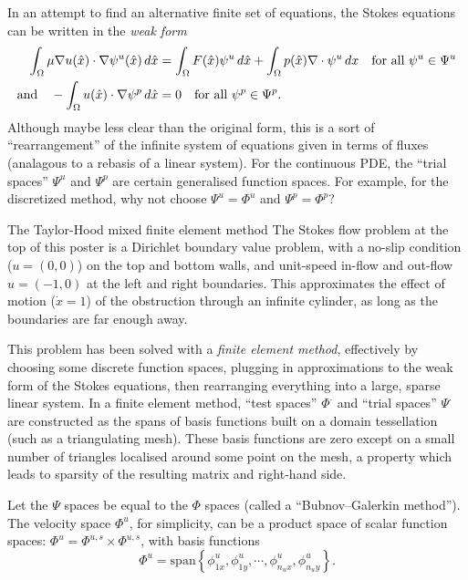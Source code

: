 \documentclass{article}
\begin{document}
In an attempt to find an alternative finite set of equations, the Stokes equations can be written in the \textit{weak form}
\begin{equation}\label{steady_stokes_weak_form}
\begin{split}
        \int_{\Omega} \mu\nabla u(\hat{x})\cdot \nabla\psi^u(\hat{x})\,d\hat{x}
            &= \int_{\Omega}F(\hat{x})\psi^u\,d\hat{x}
            +\int_{\Omega} p(\hat{x})\nabla\cdot\psi^u\,dx \text{\quad for all $\psi^u \in \Psi^u$}\\
    \text{and\quad} -\int_{\Omega}u(\hat{x})\cdot\nabla\psi^p\,d\hat{x} &= 0 \text{\quad for all $\psi^p \in \Psi^p$}.
\end{split}
\end{equation}
Although maybe less clear than the original form, this is a sort of ``rearrangement'' of the infinite system of equations given in terms of fluxes
(analagous to a rebasis of a linear system).
For the continuous PDE, the ``trial spaces'' $\Psi^u$ and $\Psi^p$ are certain generalised function spaces.
For example, for the discretized method, why not choose $\Psi^u = \Phi^u$ and $\Psi^p = \Phi^p$?


\newpage
\vskip 0.2in
{\large The Taylor-Hood mixed finite element method}
\vskip 0.2in
The Stokes flow problem at the top of this poster is a Dirichlet boundary value problem, with a no-slip condition ($u = (0,0)$) on the top
and bottom walls, and unit-speed in-flow and out-flow $u = (-1,0)$ at the left and right boundaries. This approximates the effect of motion
($\dot{x} = 1$)
of the obstruction through an infinite cylinder, as long as the boundaries are far enough away.

This problem has been solved with a \textit{finite element method}, effectively by choosing some discrete function spaces, plugging in approximations to the weak
form of the Stokes equations, then rearranging everything into a large, sparse linear system.
In a finite element method,
``test spaces'' $\Phi^\cdot$ and ``trial spaces'' $\Psi^\cdot$ are constructed as the spans of basis functions built on a domain tessellation
(such as a triangulating mesh).
These basis functions are zero except on a small number of triangles localised around some point on the mesh, a property which leads to
sparsity of the resulting matrix and right-hand side.

Let the $\Psi$ spaces be equal to the $\Phi$ spaces (called a ``Bubnov--Galerkin method'').
The velocity space $\Phi^u$, for simplicity, can be a product space of scalar function spaces: $\Phi^u = \Phi^{u,s} \times \Phi^{u,s}$,
with basis functions
    $$\Phi^u = \text{span}\left\{\phi^u_{1x},\phi^u_{1y},\cdots,\phi^u_{n_ux},\phi^u_{n_uy}\right\}.$$
\end{document}
